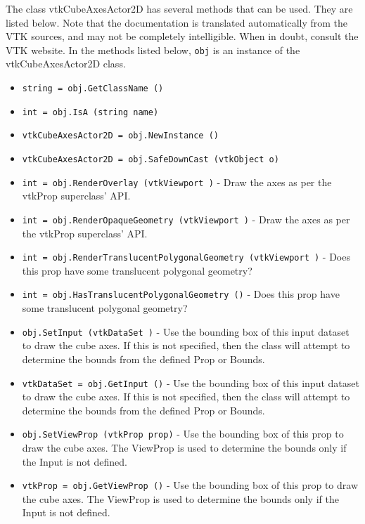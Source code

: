 The class vtkCubeAxesActor2D has several methods that can be used.
  They are listed below.
Note that the documentation is translated automatically from the VTK sources,
and may not be completely intelligible.  When in doubt, consult the VTK website.
In the methods listed below, \verb|obj| is an instance of the vtkCubeAxesActor2D class.
\begin{itemize}
\item  \verb|string = obj.GetClassName ()|

\item  \verb|int = obj.IsA (string name)|

\item  \verb|vtkCubeAxesActor2D = obj.NewInstance ()|

\item  \verb|vtkCubeAxesActor2D = obj.SafeDownCast (vtkObject o)|

\item  \verb|int = obj.RenderOverlay (vtkViewport )| -  Draw the axes as per the vtkProp superclass' API.

\item  \verb|int = obj.RenderOpaqueGeometry (vtkViewport )| -  Draw the axes as per the vtkProp superclass' API.

\item  \verb|int = obj.RenderTranslucentPolygonalGeometry (vtkViewport )| -  Does this prop have some translucent polygonal geometry?

\item  \verb|int = obj.HasTranslucentPolygonalGeometry ()| -  Does this prop have some translucent polygonal geometry?

\item  \verb|obj.SetInput (vtkDataSet )| -  Use the bounding box of this input dataset to draw the cube axes. If this
 is not specified, then the class will attempt to determine the bounds from
 the defined Prop or Bounds.

\item  \verb|vtkDataSet = obj.GetInput ()| -  Use the bounding box of this input dataset to draw the cube axes. If this
 is not specified, then the class will attempt to determine the bounds from
 the defined Prop or Bounds.

\item  \verb|obj.SetViewProp (vtkProp prop)| -  Use the bounding box of this prop to draw the cube axes. The
 ViewProp is used to determine the bounds only if the Input is not
 defined.

\item  \verb|vtkProp = obj.GetViewProp ()| -  Use the bounding box of this prop to draw the cube axes. The
 ViewProp is used to determine the bounds only if the Input is not
 defined.


\end{itemize}
